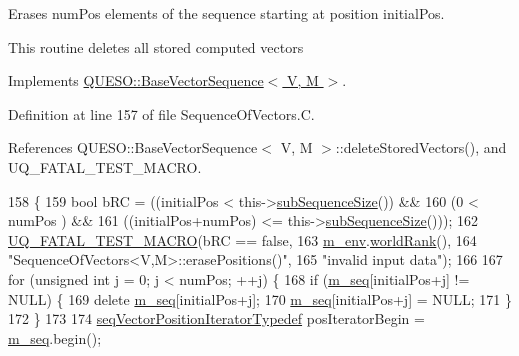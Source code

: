 Erases {\ttfamily num\-Pos} elements of the sequence starting at position {\ttfamily initial\-Pos}. 

This routine deletes all stored computed vectors 

Implements \hyperlink{class_q_u_e_s_o_1_1_base_vector_sequence_a2b41ed436f95a1816a811fc368adaf79}{Q\-U\-E\-S\-O\-::\-Base\-Vector\-Sequence$<$ V, M $>$}.



Definition at line 157 of file Sequence\-Of\-Vectors.\-C.



References Q\-U\-E\-S\-O\-::\-Base\-Vector\-Sequence$<$ V, M $>$\-::delete\-Stored\-Vectors(), and U\-Q\-\_\-\-F\-A\-T\-A\-L\-\_\-\-T\-E\-S\-T\-\_\-\-M\-A\-C\-R\-O.


\begin{DoxyCode}
158 \{
159   \textcolor{keywordtype}{bool} bRC = ((initialPos          <  this->\hyperlink{class_q_u_e_s_o_1_1_sequence_of_vectors_a0224bd3e961d86af5d2886301c0c2b86}{subSequenceSize}()) &&
160               (0                   <  numPos                 ) &&
161               ((initialPos+numPos) <= this->\hyperlink{class_q_u_e_s_o_1_1_sequence_of_vectors_a0224bd3e961d86af5d2886301c0c2b86}{subSequenceSize}()));
162   \hyperlink{_defines_8h_a56d63d18d0a6d45757de47fcc06f574d}{UQ\_FATAL\_TEST\_MACRO}(bRC == \textcolor{keyword}{false},
163                       \hyperlink{class_q_u_e_s_o_1_1_base_vector_sequence_a8e8824d2a63c5a43bcc6473e3a0491e8}{m\_env}.\hyperlink{class_q_u_e_s_o_1_1_base_environment_a78b57112bbd0e6dd0e8afec00b40ffa7}{worldRank}(),
164                       \textcolor{stringliteral}{"SequenceOfVectors<V,M>::erasePositions()"},
165                       \textcolor{stringliteral}{"invalid input data"});
166 
167   \textcolor{keywordflow}{for} (\textcolor{keywordtype}{unsigned} \textcolor{keywordtype}{int} j = 0; j < numPos; ++j) \{
168     \textcolor{keywordflow}{if} (\hyperlink{class_q_u_e_s_o_1_1_sequence_of_vectors_ae83e7c53439265667809256d0d302e5b}{m\_seq}[initialPos+j] != NULL) \{
169       \textcolor{keyword}{delete} \hyperlink{class_q_u_e_s_o_1_1_sequence_of_vectors_ae83e7c53439265667809256d0d302e5b}{m\_seq}[initialPos+j];
170       \hyperlink{class_q_u_e_s_o_1_1_sequence_of_vectors_ae83e7c53439265667809256d0d302e5b}{m\_seq}[initialPos+j] = NULL;
171     \}
172   \}
173 
174   \hyperlink{class_q_u_e_s_o_1_1_sequence_of_vectors_ac33b1b9b3f22325b49618a6591dce818}{seqVectorPositionIteratorTypedef} posIteratorBegin = 
      \hyperlink{class_q_u_e_s_o_1_1_sequence_of_vectors_ae83e7c53439265667809256d0d302e5b}{m\_seq}.begin();

\end{DoxyCode}
